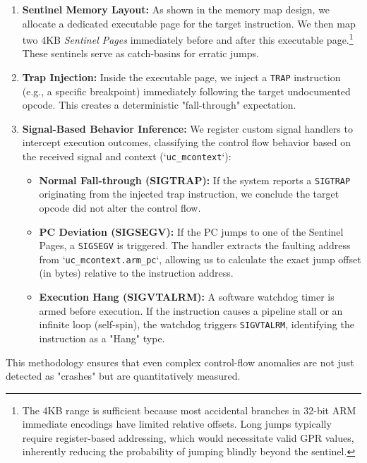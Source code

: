 \documentclass[pdflatex,sn-mathphys]{sn-jnl}%
\theoremstyle{thmstyleone}%
\theoremstyle{thmstyletwo}%
\theoremstyle{thmstylethree}%
\begin{document}
\begin{enumerate}
    \item \textbf{Sentinel Memory Layout:} As shown in the memory map design, we allocate a dedicated executable page for the target instruction. We then map two 4KB \textit{Sentinel Pages} immediately before and after this executable page.\footnote{The 4KB range is sufficient because most accidental branches in 32-bit ARM immediate encodings have limited relative offsets. Long jumps typically require register-based addressing, which would necessitate valid GPR values, inherently reducing the probability of jumping blindly beyond the sentinel.} These sentinels serve as catch-basins for erratic jumps.
    
    \item \textbf{Trap Injection:} Inside the executable page, we inject a \texttt{TRAP} instruction (e.g., a specific breakpoint) immediately following the target undocumented opcode. This creates a deterministic "fall-through" expectation.
    
    \item \textbf{Signal-Based Behavior Inference:} We register custom signal handlers to intercept execution outcomes, classifying the control flow behavior based on the received signal and context (`\texttt{uc\_mcontext}`):
    \begin{itemize}
        \item \textbf{Normal Fall-through (SIGTRAP):} If the system reports a \texttt{SIGTRAP} originating from the injected trap instruction, we conclude the target opcode did not alter the control flow.
        \item \textbf{PC Deviation (SIGSEGV):} If the PC jumps to one of the Sentinel Pages, a \texttt{SIGSEGV} is triggered. The handler extracts the faulting address from `\texttt{uc\_mcontext.arm\_pc}`, allowing us to calculate the exact jump offset (in bytes) relative to the instruction address.
        \item \textbf{Execution Hang (SIGVTALRM):} A software watchdog timer is armed before execution. If the instruction causes a pipeline stall or an infinite loop (self-spin), the watchdog triggers \texttt{SIGVTALRM}, identifying the instruction as a "Hang" type.
    \end{itemize}
\end{enumerate}

This methodology ensures that even complex control-flow anomalies are not just detected as "crashes" but are quantitatively measured.
\end{document}
